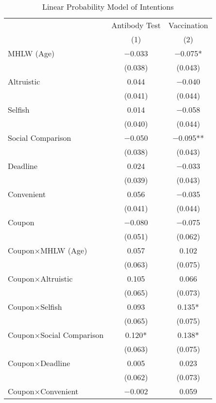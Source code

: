 \begin{table}

\caption{Linear Probability Model of Intentions \label{tab:int-reg}}
\centering
\fontsize{9}{11}\selectfont
\begin{threeparttable}
\begin{tabular}[t]{lcc}
\toprule
\multicolumn{1}{c}{ } & \multicolumn{1}{c}{Antibody Test} & \multicolumn{1}{c}{Vaccination} \\
\cmidrule(l{3pt}r{3pt}){2-2} \cmidrule(l{3pt}r{3pt}){3-3}
  & (1) & (2)\\
\midrule
MHLW (Age) & \num{-0.033} & \num{-0.075}*\\
 & (\num{0.038}) & \vphantom{1} (\num{0.043})\\
Altruistic & \num{0.044} & \num{-0.040}\\
 & (\num{0.041}) & \vphantom{1} (\num{0.044})\\
Selfish & \num{0.014} & \num{-0.058}\\
 & (\num{0.040}) & (\num{0.044})\\
Social Comparison & \num{-0.050} & \num{-0.095}**\\
 & (\num{0.038}) & (\num{0.043})\\
Deadline & \num{0.024} & \num{-0.033}\\
 & (\num{0.039}) & (\num{0.043})\\
Convenient & \num{0.056} & \num{-0.035}\\
 & (\num{0.041}) & (\num{0.044})\\
Coupon & \num{-0.080} & \num{-0.075}\\
 & (\num{0.051}) & (\num{0.062})\\
Coupon×MHLW (Age) & \num{0.057} & \num{0.102}\\
 & (\num{0.063}) & \vphantom{1} (\num{0.075})\\
Coupon×Altruistic & \num{0.105} & \num{0.066}\\
 & (\num{0.065}) & (\num{0.073})\\
Coupon×Selfish & \num{0.093} & \num{0.135}*\\
 & (\num{0.065}) & (\num{0.075})\\
Coupon×Social Comparison & \num{0.120}* & \num{0.138}*\\
 & (\num{0.063}) & (\num{0.075})\\
Coupon×Deadline & \num{0.005} & \num{0.023}\\
 & (\num{0.062}) & (\num{0.073})\\
Coupon×Convenient & \num{-0.002} & \num{0.059}\\

\end{tabular}
\end{threeparttable}
\end{table}
